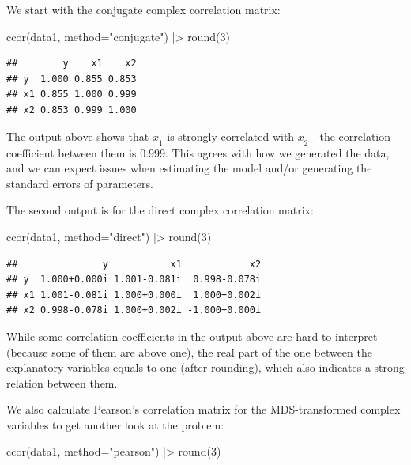 \documentclass[
]{book}
\newenvironment{Shaded}{\begin{snugshade}}{\end{snugshade}}
\newcommand{\AttributeTok}[1]{\textcolor[rgb]{0.77,0.63,0.00}{#1}}
\newcommand{\DecValTok}[1]{\textcolor[rgb]{0.00,0.00,0.81}{#1}}
\newcommand{\FunctionTok}[1]{\textcolor[rgb]{0.00,0.00,0.00}{#1}}
\newcommand{\NormalTok}[1]{#1}
\newcommand{\SpecialCharTok}[1]{\textcolor[rgb]{0.00,0.00,0.00}{#1}}
\newcommand{\StringTok}[1]{\textcolor[rgb]{0.31,0.60,0.02}{#1}}
\begin{document}
We start with the conjugate complex correlation matrix:

\begin{Shaded}
\begin{Highlighting}[]
\FunctionTok{ccor}\NormalTok{(data1, }\AttributeTok{method=}\StringTok{"conjugate"}\NormalTok{) }\SpecialCharTok{|\textgreater{}} \FunctionTok{round}\NormalTok{(}\DecValTok{3}\NormalTok{)}
\end{Highlighting}
\end{Shaded}

\begin{verbatim}
##        y    x1    x2
## y  1.000 0.855 0.853
## x1 0.855 1.000 0.999
## x2 0.853 0.999 1.000
\end{verbatim}

The output above shows that \(\underline{x}_{1}\) is strongly correlated with \(\underline{x}_{2}\) - the correlation coefficient between them is 0.999. This agrees with how we generated the data, and we can expect issues when estimating the model and/or generating the standard errors of parameters.

The second output is for the direct complex correlation matrix:

\begin{Shaded}
\begin{Highlighting}[]
\FunctionTok{ccor}\NormalTok{(data1, }\AttributeTok{method=}\StringTok{"direct"}\NormalTok{) }\SpecialCharTok{|\textgreater{}} \FunctionTok{round}\NormalTok{(}\DecValTok{3}\NormalTok{)}
\end{Highlighting}
\end{Shaded}

\begin{verbatim}
##               y           x1            x2
## y  1.000+0.000i 1.001-0.081i  0.998-0.078i
## x1 1.001-0.081i 1.000+0.000i  1.000+0.002i
## x2 0.998-0.078i 1.000+0.002i -1.000+0.000i
\end{verbatim}

While some correlation coefficients in the output above are hard to interpret (because some of them are above one), the real part of the one between the explanatory variables equals to one (after rounding), which also indicates a strong relation between them.

We also calculate Pearson's correlation matrix for the MDS-transformed complex variables to get another look at the problem:

\begin{Shaded}
\begin{Highlighting}[]
\FunctionTok{ccor}\NormalTok{(data1, }\AttributeTok{method=}\StringTok{"pearson"}\NormalTok{) }\SpecialCharTok{|\textgreater{}} \FunctionTok{round}\NormalTok{(}\DecValTok{3}\NormalTok{)}
\end{Highlighting}
\end{Shaded}
\end{document}
